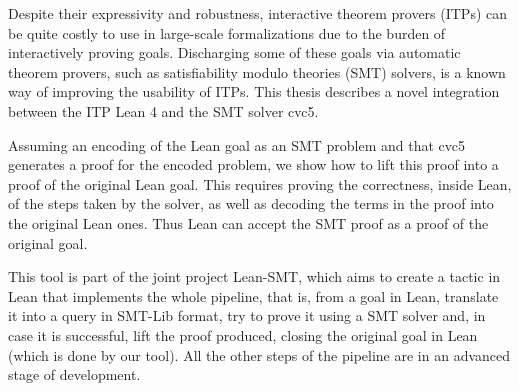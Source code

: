 Despite their expressivity and robustness, interactive theorem pro\-vers (ITPs)
can be quite costly to use in large-scale formalizations due to the burden of
interactively proving goals.
%
Discharging some of these goals via automatic theorem provers, such as
satisfiability modulo theories (SMT) solvers, is a known way of improving the
usability of ITPs.
%
This thesis describes a novel integration between the ITP
Lean 4 and the SMT solver cvc5.

Assuming an encoding of the Lean goal as an SMT problem and that cvc5
generates a proof for the encoded problem, we show how to lift this proof into
a proof of the original Lean goal.
%
This requires proving the correctness, inside Lean, of the steps taken by the
solver, as well as decoding the terms in the proof into the original Lean
ones. Thus Lean can accept the SMT proof as a proof of the original goal.

This tool is part of the joint project Lean-SMT, which aims to create a
tactic in Lean that implements the whole pipeline, that is, from a goal in
Lean, translate it into a query in SMT-Lib format, try to prove it using
a SMT solver and, in case it is successful, lift the proof produced,
closing the original goal in Lean (which is done by our tool).
All the other steps of the pipeline are in an advanced stage of development.
